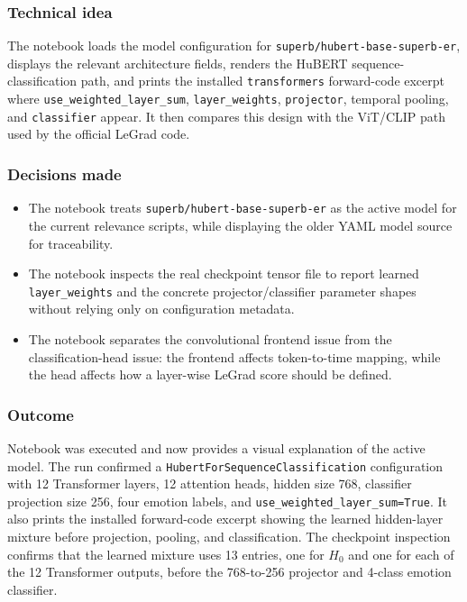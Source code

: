 \documentclass[11pt]{article}
\begin{document}
\subsubsection*{Technical idea}
The notebook loads the model configuration for
\texttt{superb/hubert-base-superb-er}, displays the relevant architecture
fields, renders the HuBERT sequence-classification path, and prints the
installed \texttt{transformers} forward-code excerpt where
\texttt{use\_weighted\_layer\_sum}, \texttt{layer\_weights},
\texttt{projector}, temporal pooling, and \texttt{classifier} appear. It then
compares this design with the ViT/CLIP path used by the official LeGrad code.

\subsubsection*{Decisions made}
\begin{itemize}
  \item The notebook treats \texttt{superb/hubert-base-superb-er} as the active
  model for the current relevance scripts, while displaying the older YAML model
  source for traceability.
  \item The notebook inspects the real checkpoint tensor file to report learned
  \texttt{layer\_weights} and the concrete projector/classifier parameter
  shapes without relying only on configuration metadata.
  \item The notebook separates the convolutional frontend issue from the
  classification-head issue: the frontend affects token-to-time mapping, while
  the head affects how a layer-wise LeGrad score should be defined.
\end{itemize}

\subsubsection*{Outcome}
Notebook  was executed and now provides a
visual explanation of the active model. The run confirmed a
\texttt{HubertForSequenceClassification} configuration with 12 Transformer
layers, 12 attention heads, hidden size 768, classifier projection size 256,
four emotion labels, and \texttt{use\_weighted\_layer\_sum=True}. It also
prints the installed forward-code excerpt showing the learned hidden-layer
mixture before projection, pooling, and classification. The checkpoint
inspection confirms that the learned mixture uses 13 entries, one for $H_0$ and
one for each of the 12 Transformer outputs, before the 768-to-256 projector and
4-class emotion classifier.
\end{document}
